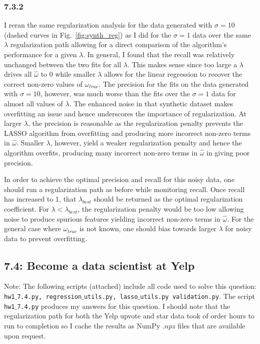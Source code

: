\documentclass[12pt]{amsart}
\begin{document}
\subsubsection*{7.3.2}

I reran the same regularization analysis for the data generated with $\sigma = 10$ (dashed curves in Fig.~\ref{fig:synth_reg}) as I did for the $\sigma = 1$ data over the same $\lambda$ regularization path allowing for a direct comparison of the algorithm's performance for a given $\lambda$.  In general, I found that the recall was relatively unchanged between the two fits for all $\lambda$.  This makes sense since too large a $\lambda$ drives all $\hat{\omega}$ to 0 while smaller $\lambda$ allows for the linear regression to recover the correct non-zero values of $\omega_{true}$.  The precision for the fits on the data generated with $\sigma = 10$, however, was much worse than the fits over the $\sigma = 1$ data for almost all values of $\lambda$.  The enhanced noise in that synthetic dataset makes overfitting an issue and hence underscores the importance of regularization.  At larger $\lambda$, the precision is reasonable as the regularization penalty prevents the LASSO algorithm from overfitting and producing more incorrect non-zero terms in $\hat{\omega}$.  Smaller $\lambda$, however, yield a weaker regularization penalty and hence the algorithm overfits, producing many incorrect non-zero terms in $\hat{\omega}$ in giving poor precision.  

In order to achieve the optimal precision and recall for this noisy data, one should run a regularization path as before while monitoring recall.  Once recall has increased to 1, that $\lambda_{best}$ should be returned as the optimal regularization coefficient.  For $\lambda < \lambda_{best}$, the regularization penalty would be too low allowing noise to produce spurious features yielding incorrect non-zero terms in $\hat{\omega}$.  For the general case where $\omega_{true}$ is not known, one should bias towards larger $\lambda$ for noisy data to prevent overfitting.

\subsection*{7.4: Become a data scientist at Yelp}

Note: The following scripts (attached) include all code used to solve this question: {\tt hw1$\_$7.4.py, regression$\_$utils.py, lasso$\_$utils.py  validation.py}.  The script {\tt hw1$\_$7.4.py} produces my answers for this question.  I should note that the regularization path for both the Yelp upvote and star data took of order hours to run to completion so I cache the results as NumPy $.npz$ files that are available upon request.  
\end{document}
